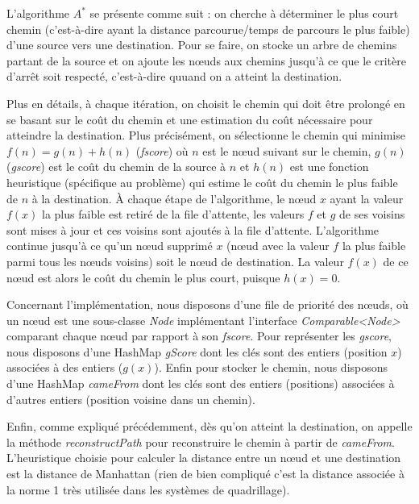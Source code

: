 \documentclass[a4paper, 10pt, french]{article}
\begin{document}
	L'algorithme $A^*$ se présente comme suit : on cherche à déterminer le plus court chemin (c'est-à-dire ayant la distance parcourue/temps de parcours le plus faible) d'une source vers une destination. Pour se faire, on stocke un arbre de chemins partant de la source et on ajoute les nœuds aux chemins jusqu'à ce que le critère d'arrêt soit respecté, c'est-à-dire quuand on a atteint la destination. 
	\par\leavevmode\par
	Plus en détails, à chaque itération, on choisit le chemin qui doit être prolongé en se basant sur le coût du chemin et une estimation du coût nécessaire pour atteindre la destination. Plus précisément, on sélectionne le chemin qui minimise $f(n) = g(n) + h(n)$ ({\it fscore}) où $n$ est le nœud suivant sur le chemin, $g(n)$ ({\it gscore}) est le coût du chemin de la source à $n$ et $h(n)$ est une fonction heuristique (spécifique au problème) qui estime le coût du chemin le plus faible de $n$ à la destination. À chaque étape de l'algorithme, le nœud $x$ ayant la valeur $f(x)$ la plus faible est retiré de la file d'attente, les valeurs $f$ et $g$ de ses voisins sont mises à jour et ces voisins sont ajoutés à la file d'attente. L'algorithme continue jusqu'à ce qu'un nœud supprimé $x$ (nœud avec la valeur $f$ la plus faible parmi tous les nœuds voisins) soit le nœud de destination. La valeur $f(x)$ de ce nœud est alors le coût du chemin le plus court, puisque $h(x) = 0$.
	\par\leavevmode\par
	Concernant l'implémentation, nous disposons d'une file de priorité des nœuds, où un nœud est une sous-classe {\it Node} implémentant l'interface {\it Comparable<Node>} comparant chaque nœud par rapport à son {\it fscore}. Pour représenter les {\it gscore}, nous disposons d'une HashMap {\it gScore} dont les clés sont des entiers (position $x$) associées à des entiers ($g(x)$). Enfin pour stocker le chemin, nous disposons d'une HashMap {\it cameFrom} dont les clés sont des entiers (positions) associées à d'autres entiers (position voisine dans un chemin). 
	\par\leavevmode\par	
	Enfin, comme expliqué précédemment, dès qu'on atteint la destination, on appelle la méthode {\it reconstructPath} pour reconstruire le chemin à partir de {\it cameFrom}. L'heuristique choisie pour calculer la distance entre un nœud et une destination est la distance de Manhattan (rien de bien compliqué c'est la distance associée à la norme 1 très utilisée dans les systèmes de quadrillage).
	
\end{document}
